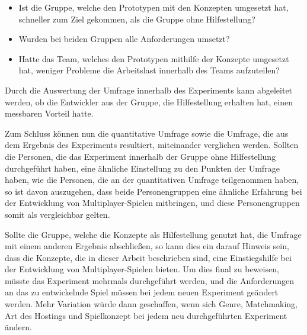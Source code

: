 \begin{itemize}
	\item Ist die Gruppe, welche den Prototypen mit den Konzepten umgesetzt hat, schneller zum Ziel gekommen, als die Gruppe ohne Hilfestellung?
	\item Wurden bei beiden Gruppen alle Anforderungen umsetzt?
	\item Hatte das Team, welches den Prototypen mithilfe der Konzepte umgesetzt hat, weniger Probleme die Arbeitslast innerhalb des Teams aufzuteilen?
\end{itemize}

Durch die Auswertung der Umfrage innerhalb des Experiments kann abgeleitet werden, ob die Entwickler aus der Gruppe, die Hilfestellung erhalten hat, einen messbaren Vorteil hatte.

Zum Schluss können nun die quantitative Umfrage sowie die Umfrage, die aus dem Ergebnis des Experiments resultiert, miteinander verglichen werden. Sollten die Personen, die das Experiment innerhalb der Gruppe ohne Hilfestellung durchgeführt haben, eine ähnliche Einstellung zu den Punkten der Umfrage haben, wie die Personen, die an der quantitativen Umfrage teilgenommen haben, so ist davon auszugehen, dass beide Personengruppen eine ähnliche Erfahrung bei der Entwicklung von Multiplayer-Spielen mitbringen, und diese Personengruppen somit als vergleichbar gelten.

Sollte die Gruppe, welche die Konzepte als Hilfestellung genutzt hat, die Umfrage mit einem anderen Ergebnis abschließen, so kann dies ein darauf Hinweis sein, dass die Konzepte, die in dieser Arbeit beschrieben sind, eine Einstiegshilfe bei der Entwicklung von Multiplayer-Spielen bieten. Um dies final zu beweisen, müsste das Experiment mehrmals durchgeführt werden, und die Anforderungen an das zu entwickelnde Spiel müssen bei jedem neuen Experiment geändert werden. Mehr Variation würde dann geschaffen, wenn sich Genre, Matchmaking, Art des Hostings und Spielkonzept bei jedem neu durchgeführten Experiment ändern.